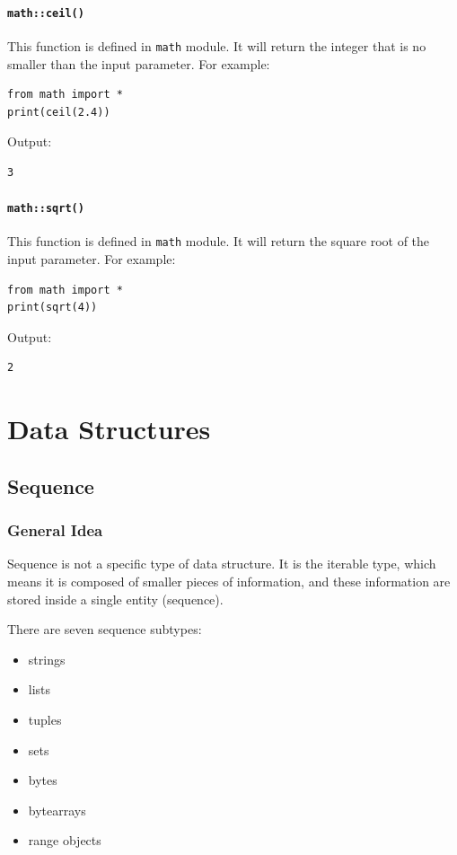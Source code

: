 \documentclass[12pt]{book}
\begin{document}
\subsubsection{\texttt{math::ceil()}}
\label{sec:orgc39a34c}
This function is defined in \texttt{math} module. It will return the integer that is no smaller than the input parameter. For example:
\begin{verbatim}
from math import *
print(ceil(2.4))
\end{verbatim}
Output:
\begin{verbatim}
3
\end{verbatim}

\subsubsection{\texttt{math::sqrt()}}
\label{sec:orge9058dd}
This function is defined in \texttt{math} module. It will return the square root of the input parameter. For example:
\begin{verbatim}
from math import *
print(sqrt(4))
\end{verbatim}
Output:
\begin{verbatim}
2
\end{verbatim}

\chapter{Data Structures}
\label{sec:orgb8bdbb7}
\section{Sequence}
\label{sec:orge70b650}
\subsection{General Idea}
\label{sec:org5e1c32b}
Sequence is not a specific type of data structure. It is the iterable type, which means it is composed of smaller pieces of information, and these information are stored inside a single entity (sequence).

There are seven sequence subtypes:
\begin{itemize}
\item strings
\item lists
\item tuples
\item sets
\item bytes
\item bytearrays
\item range objects
\end{itemize}
\end{document}
